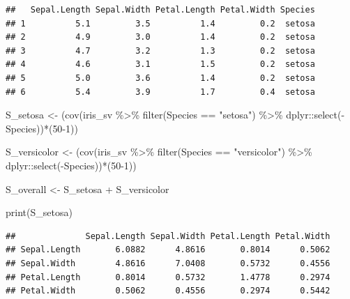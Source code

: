 \documentclass[
]{article}
\newenvironment{Shaded}{\begin{snugshade}}{\end{snugshade}}
\newcommand{\DecValTok}[1]{\textcolor[rgb]{0.00,0.00,0.81}{#1}}
\newcommand{\FunctionTok}[1]{\textcolor[rgb]{0.00,0.00,0.00}{#1}}
\newcommand{\NormalTok}[1]{#1}
\newcommand{\OtherTok}[1]{\textcolor[rgb]{0.56,0.35,0.01}{#1}}
\newcommand{\SpecialCharTok}[1]{\textcolor[rgb]{0.00,0.00,0.00}{#1}}
\newcommand{\StringTok}[1]{\textcolor[rgb]{0.31,0.60,0.02}{#1}}
\begin{document}
\begin{verbatim}
##   Sepal.Length Sepal.Width Petal.Length Petal.Width Species
## 1          5.1         3.5          1.4         0.2  setosa
## 2          4.9         3.0          1.4         0.2  setosa
## 3          4.7         3.2          1.3         0.2  setosa
## 4          4.6         3.1          1.5         0.2  setosa
## 5          5.0         3.6          1.4         0.2  setosa
## 6          5.4         3.9          1.7         0.4  setosa
\end{verbatim}

\begin{Shaded}
\begin{Highlighting}[]
\NormalTok{S\_setosa }\OtherTok{\textless{}{-}}\NormalTok{  (}\FunctionTok{cov}\NormalTok{(iris\_sv }\SpecialCharTok{\%\textgreater{}\%} 
                         \FunctionTok{filter}\NormalTok{(Species }\SpecialCharTok{==} \StringTok{"setosa"}\NormalTok{) }\SpecialCharTok{\%\textgreater{}\%} 
\NormalTok{                         dplyr}\SpecialCharTok{::}\FunctionTok{select}\NormalTok{(}\SpecialCharTok{{-}}\NormalTok{Species))}\SpecialCharTok{*}\NormalTok{(}\DecValTok{50{-}1}\NormalTok{))}

\NormalTok{S\_versicolor }\OtherTok{\textless{}{-}}\NormalTok{  (}\FunctionTok{cov}\NormalTok{(iris\_sv }\SpecialCharTok{\%\textgreater{}\%} 
                         \FunctionTok{filter}\NormalTok{(Species }\SpecialCharTok{==} \StringTok{"versicolor"}\NormalTok{) }\SpecialCharTok{\%\textgreater{}\%} 
\NormalTok{                         dplyr}\SpecialCharTok{::}\FunctionTok{select}\NormalTok{(}\SpecialCharTok{{-}}\NormalTok{Species))}\SpecialCharTok{*}\NormalTok{(}\DecValTok{50{-}1}\NormalTok{))}

\NormalTok{S\_overall }\OtherTok{\textless{}{-}}\NormalTok{  S\_setosa }\SpecialCharTok{+}\NormalTok{ S\_versicolor}

\FunctionTok{print}\NormalTok{(S\_setosa)}
\end{Highlighting}
\end{Shaded}

\begin{verbatim}
##              Sepal.Length Sepal.Width Petal.Length Petal.Width
## Sepal.Length       6.0882      4.8616       0.8014      0.5062
## Sepal.Width        4.8616      7.0408       0.5732      0.4556
## Petal.Length       0.8014      0.5732       1.4778      0.2974
## Petal.Width        0.5062      0.4556       0.2974      0.5442
\end{verbatim}
\end{document}
